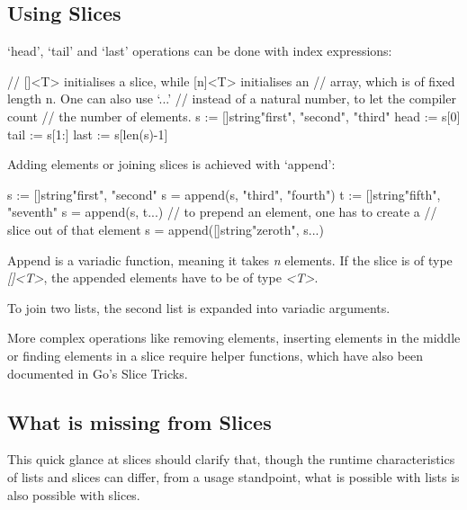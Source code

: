 \subsection{Using Slices}

`head', `tail' and `last' operations can be done with index expressions:

\begin{gocode}
// []<T> initialises a slice, while [n]<T> initialises an
// array, which is of fixed length n. One can also use `...'
// instead of a natural number, to let the compiler count
// the number of elements.
s := []string{"first", "second", "third"}
head := s[0]
tail := s[1:]
last := s[len(s)-1]
\end{gocode}

Adding elements or joining slices is achieved with `append':

\begin{gocode}
s := []string{"first", "second"}
s = append(s, "third", "fourth")
t := []string{"fifth", "seventh"}
s = append(s, t...)
// to prepend an element, one has to create a
// slice out of that element
s = append([]string{"zeroth"}, s...)
\end{gocode}

Append is a variadic function, meaning it takes \textit{n} elements. If the slice is of type \textit{[]<T>},
the appended elements have to be of type \textit{<T>}.

To join two lists, the second list is expanded into
variadic arguments.

More complex operations like removing elements, inserting elements in the middle or finding
elements in a slice require helper functions, which have also been documented in Go's
Slice Tricks\autocite{slice-tricks}.

\subsection{What is missing from Slices}

This quick glance at slices should clarify that, though the runtime characteristics of lists and slices
can differ, from a usage standpoint, what is possible with lists is also possible with slices.

